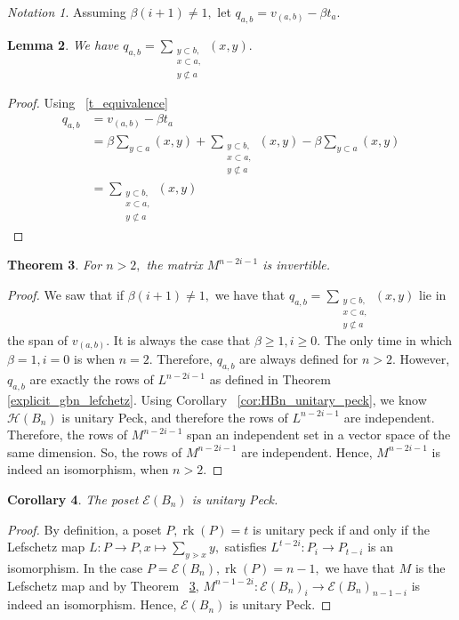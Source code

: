 \documentclass[10 pt]{amsart}
\theoremstyle{plain}
\newtheorem{thm}{Theorem}[section]
\newtheorem{lem}[thm]{Lemma}
\newtheorem{cor}[thm]{Corollary}
\theoremstyle{definition}
\theoremstyle{remark}
\newtheorem{note}[thm]{Notation}
\numberwithin{equation}{section}
\newcommand\rk{\operatorname{rk}}
\begin{document}
\begin{note}
Assuming $\beta(i+1) \neq 1,$ let $q_{a,b} = v_{(a, b)} - \beta t_a.$
\end{note}

\begin{lem}
We have $q_{a,b} = \sum_{\substack{{y\subset b,}\\{x \subset a,}\\{y\not\subset a}}}^{}(x, y).$
\end{lem}
\begin{proof}
Using ~\ref{t_equivalence}
\begin{align*}
	q_{a,b} &= v_{(a, b)} - \beta t_a \\
	&= \beta \sum_{y \subset a}^{}(x, y) + \sum_{\substack{{y\subset b,}\\{x \subset a,}\\{y\not\subset a}}}^{}(x, y) - \beta\sum_{y\subset a}^{}(x, y)\\
	&= \sum_{\substack{{y\subset b,}\\{x \subset a,}\\{y\not\subset a}}}^{}(x, y)
\end{align*}
\end{proof}

\begin{thm}
\label{thm:invertibility_lefschetz}
For $n >2,$ the matrix $M^{n-2i-1}$ is invertible.
\end{thm}
\begin{proof}
We saw that if $\beta(i+1) \neq 1,$ we have that $q_{a,b} = \sum_{\substack{{y\subset b,}\\{x \subset a,}\\{y\not\subset a}}}^{}(x, y)$ lie in the span of $v_{(a, b)}.$ It is always the case that $\beta \geq 1,i \geq 0.$ The only time in which $\beta = 1,i=0$ is when $n = 2.$ Therefore, $q_{a,b}$ are always defined for $n > 2.$ However, $q_{a,b}$ are exactly the rows of $L^{n-2i-1}$ as defined in Theorem \ref{explicit_gbn_lefchetz}. Using Corollary ~\ref{cor:HBn_unitary_peck}, we know $\mathcal H(B_n)$ is unitary Peck, and therefore the rows of $L^{n-2i-1}$ are independent. Therefore, the rows of $M^{n-2i-1}$ span an independent set in a vector space of the same dimension. So, the rows of $M^{n-2i-1}$ are independent. Hence, $M^{n-2i-1}$ is indeed an isomorphism, when $n > 2.$
\end{proof}

\begin{cor}
\label{cor:unitary_peck_edge_bn}
The poset $\mathcal E(B_n)$ is unitary Peck.
\end{cor}
\begin{proof}
By definition, a poset $P,\rk(P) = t$  is unitary peck if and only if the Lefschetz map $L:P \rightarrow P,x \mapsto \sum_{y \gtrdot x} y,$ satisfies $L^{t-2i}:P_i \rightarrow P_{t-i}$ is an isomorphism. In the case $P = \mathcal E(B_n),\rk(P) = n-1,$ we have that $M$ is the Lefschetz map and by Theorem ~\ref{thm:invertibility_lefschetz}, $M^{n-1-2i}:\mathcal E(B_n)_i \rightarrow \mathcal E(B_n)_{n-1-i}$ is indeed an isomorphism. Hence, $\mathcal E(B_n)$ is unitary Peck.
\end{proof}
\end{document}
